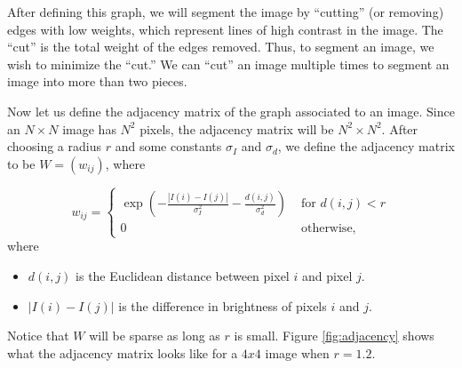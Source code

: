 After defining this graph, we will segment the image by ``cutting'' (or removing) edges with low weights, which represent lines of high contrast in the image. 
The ``cut'' is the total weight of the edges removed. Thus, to segment an image, we wish to minimize the ``cut.''
We can ``cut'' an image multiple times to segment an image into more than two pieces.

Now let us define the adjacency matrix of the graph associated to an image. 
Since an $N \times N$ image has $N^2$ pixels, the adjacency matrix will be $N^2 \times N^2$.
After choosing a radius $r$ and some constants $\sigma_I$ and $\sigma_d$, we define the adjacency matrix to be $W = (w_{ij})$, where

\begin{equation}
\label{eq:adjacency}
w_{ij} = \begin{cases} \exp(-\frac{|I(i) - I(j)|}{\sigma_I^2}-\frac{d(i,j)}{\sigma_d^2}) & \mbox{ for $d(i,j) < r$} \\ 0 & \mbox{ otherwise,} \end{cases}
\end{equation}
where
\begin{itemize}
	\item$d(i,j)$ is the Euclidean distance between pixel $i$ and pixel $j$.
	\item $|I(i) - I(j)|$ is the difference in brightness of pixels $i$ and $j$.
\end{itemize}

Notice that $W$ will be sparse as long as $r$ is small. Figure \ref{fig:adjacency} shows what the adjacency matrix looks like for a $4x4$ image when $r=1.2$.

